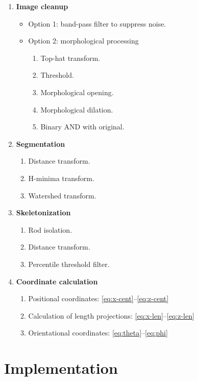 \begin{enumerate}

\item \textbf{Image cleanup}
    \begin{itemize}
    \item Option 1: band-pass filter to suppress noise.~\cite{crocker}
    \item Option 2: morphological processing
        \begin{enumerate}
        \item Top-hat transform.
        \item Threshold.
        \item Morphological opening.
        \item Morphological dilation.
        \item Binary AND with original.
        \end{enumerate}
    \end{itemize}

\item \textbf{Segmentation}
    \begin{enumerate}
    \item Distance transform.
    \item H-minima transform.
    \item Watershed transform.
    \end{enumerate}

\item \textbf{Skeletonization}
    \begin{enumerate}
    \item Rod isolation.
    \item Distance transform.
    \item Percentile threshold filter.
    \end{enumerate}

\item \textbf{Coordinate calculation}
    \begin{enumerate}
    \item Positional coordinates: \ref{eq:x-cent}--\ref{eq:z-cent}
    \item Calculation of length projections: \ref{eq:x-len}--\ref{eq:z-len}
    \item Orientational coordinates: \ref{eq:theta}--\ref{eq:phi}
    \end{enumerate}

\end{enumerate}

\section{Implementation}
\label{sec:matlab-implementation}

